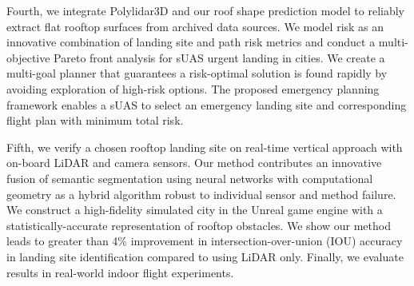 Fourth, we integrate Polylidar3D and our roof shape prediction model to reliably extract flat rooftop surfaces from archived data sources.  We model risk as an innovative combination of landing site and path risk metrics and conduct a multi-objective Pareto front analysis for sUAS urgent landing in cities. We create a multi-goal planner that guarantees a risk-optimal solution is found rapidly by avoiding exploration of high-risk options. The proposed emergency planning framework enables a sUAS to select an emergency landing site and corresponding flight plan with minimum total risk.

Fifth, we verify a chosen rooftop landing site on real-time vertical approach with on-board LiDAR and camera sensors. Our method contributes an innovative fusion of semantic segmentation using neural networks with computational geometry as a hybrid algorithm robust to individual sensor and method failure.  We construct a high-fidelity simulated city in the Unreal game engine with a statistically-accurate representation of rooftop obstacles. We show our method leads to greater than 4\% improvement in intersection-over-union (IOU) accuracy in landing site identification compared to using LiDAR only. Finally, we evaluate results in real-world indoor flight experiments.


